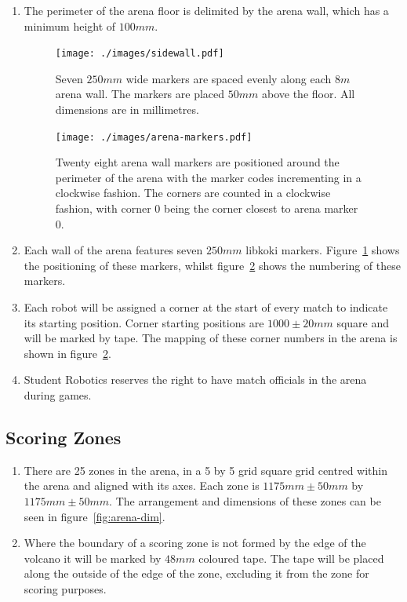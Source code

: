 \begin{enumerate}
\item The perimeter of the arena floor is delimited by the arena wall, which has a minimum height of $100mm$.

\begin{figure}
  \centering
  \texttt{[image: ./images/sidewall.pdf]}
  \caption{Seven $250mm$ wide markers are spaced evenly along each $8m$ arena wall.
           The markers are placed $50mm$ above the floor.
           All dimensions are in millimetres.}
  \label{fig:arena-wall}
\end{figure}

\begin{figure}
  \centering
  \texttt{[image: ./images/arena-markers.pdf]}
  \caption{Twenty eight arena wall markers are positioned around the perimeter of the arena with the marker codes incrementing in a clockwise fashion.
           The corners are counted in a clockwise fashion, with corner 0 being the corner closest to arena marker 0.}
  \label{fig:arena-zones}
\end{figure}

\item Each wall of the arena features seven $250mm$ libkoki markers.
      Figure~\ref{fig:arena-wall} shows the positioning of these markers, whilst figure~\ref{fig:arena-zones} shows the numbering of these markers.

\item Each robot will be assigned a corner at the start of every match to indicate its starting position.
      Corner starting positions are $1000 \pm 20mm$ square and will be marked by tape.
      The mapping of these corner numbers in the arena is shown in figure~\ref{fig:arena-zones}.

\item Student Robotics reserves the right to have match officials in the arena during games.

\end{enumerate}


\subsection{Scoring Zones}
\label{sub:Zones}

\begin{enumerate}
\item There are 25 zones in the arena, in a 5 by 5 grid square grid centred within the arena and aligned with its axes. Each zone is $1175mm \pm 50mm$ by $1175mm \pm 50mm$.
      The arrangement and dimensions of these zones can be seen in figure~\ref{fig:arena-dim}.

\item Where the boundary of a scoring zone is not formed by the edge of the volcano it will be marked by $48mm$ coloured tape.
      The tape will be placed along the outside of the edge of the zone, excluding it from the zone for scoring purposes.
\end{enumerate}

